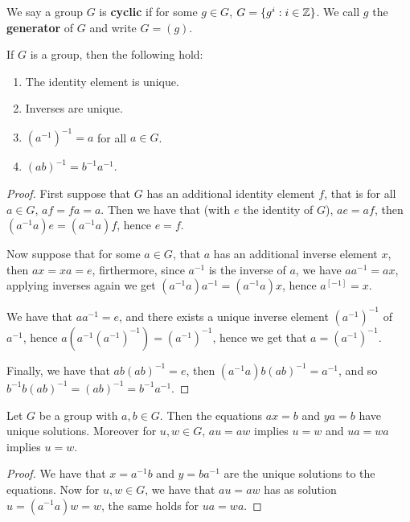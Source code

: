 \begin{definition}
    We say a group $G$ is \textbf{cyclic} if for some $g \in G$,  $G=\{g^i:i \in \mathbb{Z}\}$. We call $g$
    the \textbf {generator} of $G$ and write  $G=(g)$.
\end{definition}

\begin{lemma}\label{1.1.1}
    If $G$ is a group, then the following hold:
        \begin{enumerate}[label=(\arabic*)]
            \item The identity element is unique.

            \item Inverses are unique.

            \item  $(a^{-1})^{-1}=a$ for all $a \in G$.

            \item  $(ab)^{-1}=b^{-1}a^{-1}$.
        \end{enumerate}
\end{lemma}
\begin{proof}
    First suppose that $G$ has an additional identity element  $f$, that is for all $a \in G$,
    $af=fa=a$. Then we have that  (with $e$ the identity of  $G$), $ae=af$, then
    $(a^{-1}a)e=(a^{-1}a)f$, hence $e=f$.

    Now suppose that for some  $a \in G$, that  $a$ has an additional inverse element  $x$, then
    $ax=xa=e$, firthermore, since  $a^{-1}$ is the inverse of $a$, we have  $aa^{-1}=ax$, applying
    inverses again we get $(a^{-1}a)a^{-1}=(a^{-1}a)x$, hence $a^[-1]=x$.

    We have that $aa^{-1}=e$, and there exists a unique inverse element $(a^{-1})^{-1}$ of $a^{-1}$,
    hence $a(a^{-1}(a^{-1})^{-1})=(a^{-1})^{-1}$, hence we get that $a=(a^{-1})^{-1}$.

    Finally, we have that $ab(ab)^{-1}=e$, then $(a^{-1}a)b(ab)^{-1}=a^{-1}$, and so
    $b^{-1}b(ab)^{-1}=(ab)^{-1}=b^{-1}a^{-1}$.
\end{proof}

\begin{lemma}\label{1.1.2}
    Let $G$ be a group with  $a,b \in G$. Then the equations  $ax=b$ and  $ya=b$ have unique
    solutions. Moreover for $u,w \in G$,  $au=aw$ implies  $u=w$ and  $ua=wa$ implies  $u=w$.
\end{lemma}
\begin{proof}
    We have that $x=a^{-1}b$ and $y=ba^{-1}$ are the unique solutions to the equations. Now for $u,w
    \in G$, we have that  $au=aw$ has as solution  $u=(a^{-1}a)w=w$, the same holds for $ua=wa$.
\end{proof}
